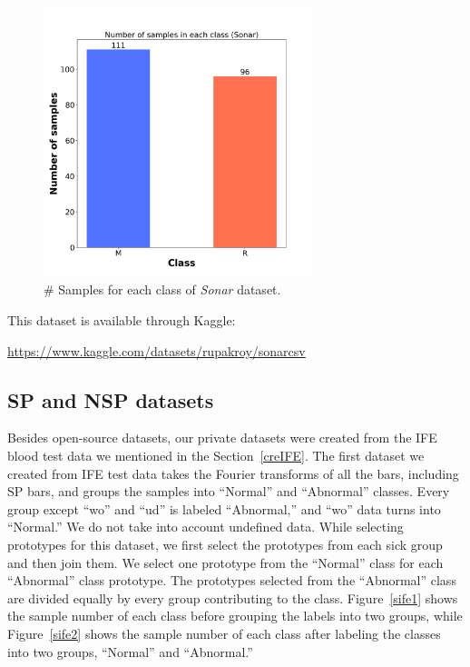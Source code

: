 \begin{figure}[H]
    \centering
    \includegraphics[width=0.7\textwidth]{images/sample/sonar.png}
    \caption{\# Samples for each class of \textit{Sonar} dataset.}
    \label{ssonar}
\end{figure}
\vspace{10pt}

\noindent This dataset is available through Kaggle:

\noindent \url{https://www.kaggle.com/datasets/rupakroy/sonarcsv}


\subsection{SP and NSP datasets}

Besides open-source datasets, our private datasets were created from the IFE blood test data we mentioned in the Section~\ref{creIFE}. The first dataset we created from IFE test data takes the Fourier transforms of all the bars, including SP bars, and groups the samples into “Normal” and “Abnormal” classes. Every group except “wo” and “ud” is labeled “Abnormal,” and “wo” data turns into “Normal.” We do not take into account undefined data. While selecting prototypes for this dataset, we first select the prototypes from each sick group and then join them. We select one prototype from the “Normal” class for each “Abnormal” class prototype. The prototypes selected from the “Abnormal” class are divided equally by every group contributing to the class. Figure~\ref{sife1} shows the sample number of each class before grouping the labels into two groups, while Figure~\ref{sife2} shows the sample number of each class after labeling the classes into two groups, “Normal” and “Abnormal.”


